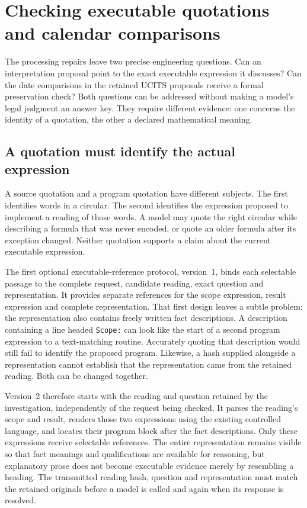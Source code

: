 \section{Checking executable quotations and calendar comparisons}
\label{sec:executable-dates}

The processing repairs leave two precise engineering questions. Can an
interpretation proposal point to the exact executable expression it discusses?
Can the date comparisons in the retained UCITS proposals receive a formal
preservation check? Both questions can be addressed without making a model's
legal judgment an answer key. They require different evidence: one concerns
the identity of a quotation, the other a declared mathematical meaning.

\subsection{A quotation must identify the actual expression}

A source quotation and a program quotation have different subjects. The first
identifies words in a circular. The second identifies the expression proposed
to implement a reading of those words. A model may quote the right circular
while describing a formula that was never encoded, or quote an older formula
after its exception changed. Neither quotation supports a claim about the
current executable expression.

The first optional executable-reference protocol, version~1, binds each
selectable passage to the complete request, candidate reading, exact question
and representation. It provides separate references for the scope expression,
result expression and complete representation. That first design leaves a
subtle problem: the representation also contains freely written fact
descriptions. A description containing a line headed \texttt{Scope:} can look
like the start of a second program expression to a text-matching routine.
Accurately quoting that description would still fail to identify the proposed
program. Likewise, a hash supplied alongside a representation cannot establish
that the representation came from the retained reading. Both can be changed
together.

Version~2 therefore starts with the reading and question retained by the
investigation, independently of the request being checked. It parses the
reading's scope and result, renders those two expressions using the existing
controlled language, and locates their program block after the fact
descriptions. Only these expressions receive selectable references. The entire
representation remains visible so that fact meanings and qualifications are
available for reasoning, but explanatory prose does not become executable
evidence merely by resembling a heading. The transmitted reading hash,
question and representation must match the retained originals before a model
is called and again when its response is resolved.

